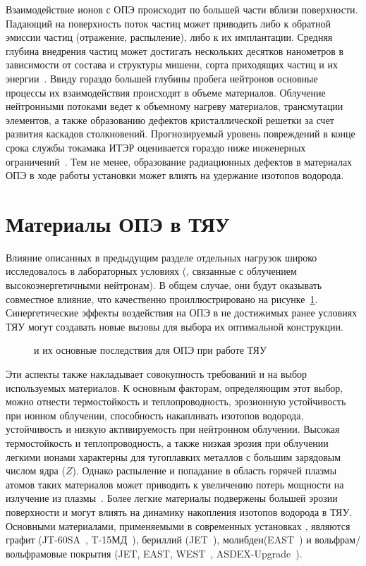 Взаимодействие ионов с ОПЭ происходит по большей части вблизи поверхности. Падающий на поверхность поток частиц может приводить либо к обратной эмиссии частиц (отражение, распыление), либо к их имплантации. Средняя глубина внедрения частиц может достигать нескольких десятков нанометров в зависимости от состава и структуры мишени, сорта приходящих частиц и их энергии~\cite{eckstein2010penetration}. Ввиду гораздо большей глубины пробега нейтронов основные процессы их взаимодействия происходят в объеме материалов. Облучение нейтронными потоками ведет к объемному нагреву материалов, трансмутации элементов, а также образованию дефектов кристаллической решетки за счет развития каскадов столкновений. Прогнозируемый уровень повреждений в конце срока службы токамака ИТЭР оценивается гораздо ниже инженерных ограничений~\cite{Villari2013}. Тем не менее, образование радиационных дефектов в материалах ОПЭ в ходе работы установки может влиять на удержание изотопов водорода.

\section{Материалы ОПЭ в ТЯУ}\label{sec:ch1/sec2}

Влияние описанных в предыдущим разделе отдельных  нагрузок широко исследовалось в лабораторных условиях (, связанные с облучением высокоэнергетичными нейтронам). В общем случае, они будут оказывать совместное влияние, что качественно проиллюстрировано на рисунке~\cref{fig:ch1/synergetic_diagram}. Синергетические эффекты воздействия на ОПЭ в не достижимых ранее условиях ТЯУ могут создавать новые вызовы для выбора их оптимальной конструкции.
\begin{figure}[ht]
    \caption{ и их основные последствия для ОПЭ при работе ТЯУ~\cite{Linke2019}}\label{fig:ch1/synergetic_diagram}
\end{figure}
Эти аспекты также накладывает совокупность требований и на выбор используемых материалов. К основным факторам, определяющим этот выбор, можно отнести термостойкость и теплопроводность, эрозионную устойчивость при ионном облучении, способность накапливать изотопов водорода, устойчивость и низкую активируемость при нейтронном облучении. Высокая термостойкость и теплопроводность, а также низкая эрозия при облучении легкими ионами характерны для тугоплавких металлов с большим зарядовым числом ядра ($Z$). Однако распыление и попадание в область горячей плазмы атомов таких материалов может приводить к увеличению потерь мощности на излучение из плазмы~\cite{Ptterich2019}. Более легкие материалы подвержены большей эрозии поверхности и могут влиять на динамику накопления изотопов водорода в ТЯУ. Основными материалами, применяемыми в современных установках , являются графит (JT-60SA~\cite{Shirai2024}, T-15МД~\cite{Velikhov2024}), бериллий (JET~\cite{Maggi2024,Kappatou2025}), молибден(EAST~\cite{Gong2024}) и вольфрам/вольфрамовые покрытия (JET, EAST, WEST~\cite{Shi2025}, ASDEX-Upgrade~\cite{Rohde2009}). 

